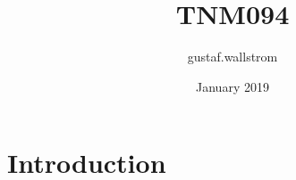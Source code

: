\documentclass{article}
\title{TNM094}
\author{gustaf.wallstrom }
\date{January 2019}
\begin{document}
\maketitle

\section{Introduction}
\end{document}
